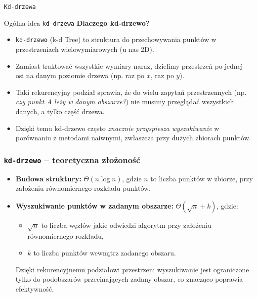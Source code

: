 \documentclass[aspectratio=1610, polish]{beamer}
\begin{document}
\begin{section}{\texttt{Kd-drzewa}}

\begin{frame}{Ogólna idea \texttt{kd-drzewa}}
    \textbf{Dlaczego kd-drzewo?}\\
    \vspace{0.4em}
    \begin{itemize}
        \item \texttt{kd-drzewo} (k-d Tree) to struktura do przechowywania punktów 
              w przestrzeniach wielowymiarowych (u nas 2D).
        \item Zamiast traktować wszystkie wymiary naraz, dzielimy przestrzeń 
              po jednej osi na danym poziomie drzewa (np. raz po \(x\), raz po \(y\)).
        \item Taki rekurencyjny podział sprawia, że do wielu zapytań przestrzennych
              (np. \textit{czy punkt A leży w danym obszarze?})
              nie musimy przeglądać wszystkich danych, a tylko część drzewa.
        \item Dzięki temu kd-drzewo często \textit{znacznie przyspiesza wyszukiwanie} 
              w porównaniu z metodami naiwnymi, 
              zwłaszcza przy dużych zbiorach punktów.
    \end{itemize}
\end{frame}

\begin{frame}
        \frametitle{\texttt{kd-drzewo} -- teoretyczna złożoność}
            
        \begin{itemize}
            \item \textbf{Budowa struktury:}  
            \(\Theta(n \log n)\), gdzie \(n\) to liczba punktów w zbiorze, przy założeniu równomiernego rozkładu punktów.
        \pause
        \vspace{0.5cm}
            \item \textbf{Wyszukiwanie punktów w zadanym obszarze:}  
        \(\Theta(\sqrt{n} + k)\), gdzie:
        \begin{itemize}
            \item \(\sqrt{n}\) to liczba węzłów jakie odwiedzi algorytm przy założeniu równomiernego rozkładu,
            \item \(k\) to liczba punktów wewnątrz zadanego obszaru.  
        \end{itemize}
        Dzięki rekurencyjnemu podziałowi przestrzeni wyszukiwanie jest ograniczone tylko do podobszarów przecinających zadany obszar, co znacząco poprawia efektywność.
        \end{itemize}
    

\end{frame}
\end{section}
\end{document}
